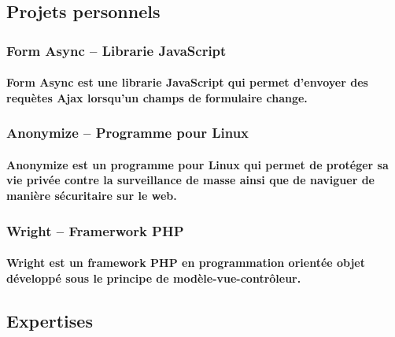 \documentclass{resume}
\begin{document}
	\vspace{2.5mm}

	\begin{multicols}{2}
		\subsection*{Projets personnels}
			\subsubsection*{Form Async – Librarie JavaScript}
			\paragraph{Form Async est une librarie JavaScript qui permet d'envoyer des requètes Ajax lorsqu'un champs de formulaire change.}

			\subsubsection*{Anonymize – Programme pour Linux}
			\paragraph{Anonymize est un programme pour Linux qui permet de protéger sa vie privée contre la surveillance de masse ainsi que de naviguer de manière sécuritaire sur le web.}

			\subsubsection*{Wright – Framerwork PHP}
			\paragraph{Wright est un framework PHP en programmation orientée objet développé sous le principe de modèle-vue-contrôleur.}

		\columnbreak

		\subsection*{Expertises}

		{\setlength\multicolsep{0pt}
		 \begin{multicols}{2}

\end{multicols}}
\end{multicols}
\end{document}
